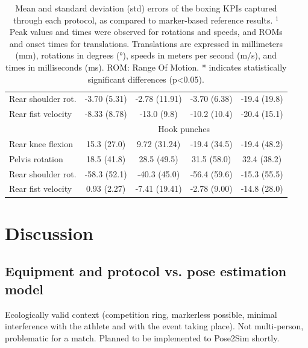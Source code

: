 \begin{table}[!ht]
{\begin{tabular}{lcccc}
          Rear shoulder rot. & -3.70 (5.31) & -2.78 (11.91) & -3.70 (6.38) & -19.4 (19.8) \\
          Rear fist velocity & -8.33 (8.78) & -13.0 (9.8) & -10.2 (10.4) & -20.4 (15.1) \\
          \cmidrule(l{2pt}r{2pt}){2-5}
          ~ & \multicolumn{4}{c}{Hook punches} \\
          \cmidrule(l{2pt}r{2pt}){2-5}
          Rear knee flexion & 15.3 (27.0) & 9.72 (31.24) & -19.4 (34.5) & -19.4 (48.2) \\
          Pelvis rotation & 18.5 (41.8) & 28.5 (49.5) & 31.5 (58.0) & 32.4 (38.2) \\
          Rear shoulder rot. & -58.3 (52.1) & -40.3 (45.0) & -56.4 (59.6) & -15.3 (55.5) \\
          Rear fist velocity & 0.93 (2.27) & -7.41 (19.41) & -2.78 (9.00) & -14.8 (28.0) \\
          \bottomrule
      \end{tabular}}
      \caption{Mean and standard deviation (std) errors of the boxing KPIs captured through each protocol, as compared to marker-based reference results. \(^1\) Peak values and times were observed for rotations and speeds, and ROMs and onset times for translations. Translations are expressed in millimeters (mm), rotations in degrees (°), speeds in meters per second (m/s), and times in milliseconds (ms).  ROM: Range Of Motion. * indicates statistically significant differences (p<0.05).}
      \label{table:tab_peakboxe}
\end{table}






\FloatBarrier
\section{Discussion}
\subsection{Equipment and protocol vs. pose estimation model}

Ecologically valid context (competition ring, markerless possible, minimal interference with the athlete and with the event taking place). Not multi-person, problematic for a match. Planned to be implemented to Pose2Sim shortly.

